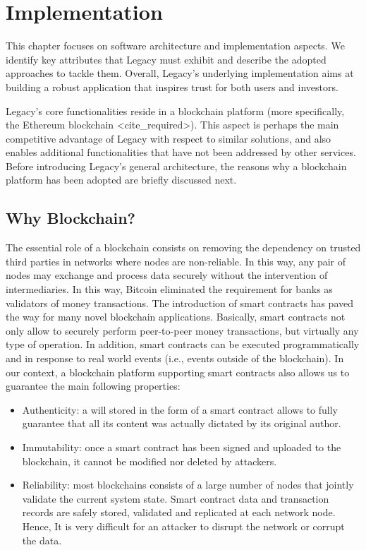 \chapter{Implementation} %
\label{cha:implementation}

This chapter focuses on software architecture and implementation aspects. We identify key attributes that Legacy must exhibit and describe the adopted approaches to tackle them. Overall, Legacy’s underlying implementation aims at building a robust application that inspires trust for both users and investors.

Legacy’s core functionalities reside in a blockchain platform (more specifically, the Ethereum blockchain <cite_required>). This aspect is perhaps the main competitive advantage of Legacy with respect to similar solutions, and also enables additional functionalities that have not been addressed by other services. Before introducing Legacy’s general architecture, the reasons why a blockchain platform has been adopted are briefly discussed next.


\section{Why Blockchain?} %
\label{sec:why_blockchain_}

The essential role of a blockchain consists on removing the dependency on trusted third parties in networks where nodes are non-reliable. In this way, any pair of nodes may exchange and process data securely without the intervention of intermediaries. In this way, Bitcoin eliminated the requirement for banks as validators of money transactions. The introduction of smart contracts has paved the way for many novel blockchain applications. Basically, smart contracts not only allow to securely perform peer-to-peer money transactions, but virtually any type of operation. In addition, smart contracts can be executed programmatically and in response to real world events (i.e., events outside of the blockchain). In our context, a blockchain platform supporting smart contracts also allows us to guarantee the main following properties: 

\begin{itemize}
	\item Authenticity: a will stored in the form of a smart contract allows to fully guarantee that all its content was actually dictated by its original author.
	\item Immutability: once a smart contract has been signed and uploaded to the blockchain, it cannot be modified nor deleted by attackers.
	\item Reliability: most blockchains consists of a large number of nodes that jointly validate the current system state. Smart contract data and transaction records are safely stored, validated and replicated at each network node. Hence, It is very difficult for an attacker to disrupt the network or corrupt the data.
\end{itemize}

